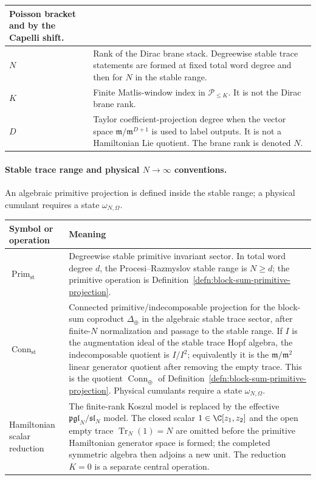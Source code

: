 \begin{center}
\begin{tabular}{@{}>{\raggedright\arraybackslash}p{}
  >{\raggedright\arraybackslash}p{}@{}}
Poisson bracket and by the Capelli shift.\\
\hline
\(N\) &
Rank of the Dirac brane stack. Degreewise stable trace statements are
formed at fixed total word degree and then for \(N\) in the stable range.\\
\hline
\(K\) &
Finite Matlis-window index in \(\mathcal P_{\le K}\).  It is not the
Dirac brane rank.\\
\hline
\(D\) &
Taylor coefficient-projection degree when the vector space
\(\mathfrak m/\mathfrak m^{D+1}\) is used to label outputs.  It is not
a Hamiltonian Lie quotient.  The brane rank is denoted \(N\).\\
\hline
\end{tabular}
\end{center}

\paragraph{\texorpdfstring{Stable trace range and physical \(N\to\infty\) conventions.}{Stable trace range and physical N-to-infinity conventions}}
An algebraic primitive projection is defined inside the stable range;
a physical cumulant requires a state \(\omega_{N,\Omega}\).
\begin{center}
\begin{tabular}{@{}>{\raggedright\arraybackslash}p{}
  >{\raggedright\arraybackslash}p{}@{}}
\hline
\textbf{Symbol or operation} & \textbf{Meaning}\\
\hline
\(\operatorname{Prim}_{\mathrm{st}}\) &
Degreewise stable primitive invariant sector. In total word degree
\(d\), the Procesi--Razmyslov stable range is \(N\geq d\); the
primitive operation is
Definition~\ref{defn:block-sum-primitive-projection}.\\
\hline
\(\operatorname{Conn}_{\mathrm{st}}\) &
Connected primitive/indecomposable projection for the block-sum
coproduct \(\Delta_\oplus\) in the algebraic stable trace sector,
after finite-\(N\) normalization and passage to the stable range.  If
\(I\) is the augmentation ideal of the stable trace Hopf algebra, the
indecomposable quotient is \(I/I^2\); equivalently it is the
\(\mathfrak m/\mathfrak m^2\) linear generator quotient after removing
the empty trace.  This is the quotient
\(\operatorname{Conn}_{\oplus}\) of
Definition~\ref{defn:block-sum-primitive-projection}.
Physical cumulants require a state \(\omega_{N,\Omega}\).\\
\hline
Hamiltonian scalar reduction &
The finite-rank Koszul model is replaced by the effective
\(\mathfrak{pgl}_N/\mathfrak{sl}_N\) model.  The closed scalar
\(1\in\C[z_1,z_2]\) and the open empty trace
\(\operatorname{Tr}_N(1)=N\) are omitted before the primitive
Hamiltonian generator space is formed; the completed symmetric algebra
then adjoins a new unit.  The reduction \(K=0\) is a separate central
operation.\\
\hline
\end{tabular}
\end{center}


